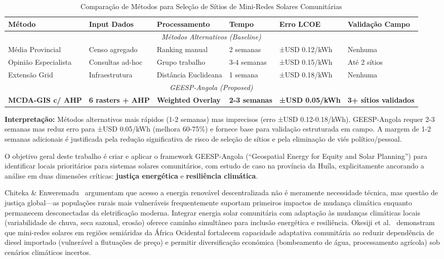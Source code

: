 \documentclass[12pt, a4paper]{article}
\begin{document}
{{{{{{{{{{{{\begin{table}[H]
\centering
\caption{Comparação de Métodos para Seleção de Sítios de Mini-Redes Solares Comunitárias}
\label{tab:metodo_comparacao}
\footnotesize
\begin{tabular}{|l|l|l|l|l|l|}
\hline
\textbf{Método} & \textbf{Input Dados} & \textbf{Processamento} & \textbf{Tempo} & \textbf{Erro LCOE} & \textbf{Validação Campo} \\
\hline
\multicolumn{6}{|c|}{\textit{Métodos Alternativos (Baseline)}} \\
\hline
Média Provincial & Censo agregado & Ranking manual & 2 semanas & ±USD 0.12/kWh & Nenhuma \\
\hline
Opinião Especialista & Consultas ad-hoc & Grupo trabalho & 3-4 semanas & ±USD 0.15/kWh & Até 2 sítios \\
\hline
Extensão Grid & Infraestrutura & Distância Euclideana & 1 semana & ±USD 0.18/kWh & Nenhuma \\
\hline
\multicolumn{6}{|c|}{\textit{GEESP-Angola (Proposed)}} \\
\hline
\textbf{MCDA-GIS c/ AHP} & \textbf{6 rasters + AHP} & \textbf{Weighted Overlay} & \textbf{2-3 semanas} & \textbf{±USD 0.05/kWh}\footnotemark[1] & \textbf{3+ sítios validados} \\
\hline
\end{tabular}
\end{table}

\noindent\textbf{Interpretação:} Métodos alternativos mais rápidos (1-2 semanas) mas imprecisos (erro ±USD 0.12-0.18/kWh). GEESP-Angola requer 2-3 semanas mas reduz erro para ±USD 0.05/kWh (melhora 60-75\%) e fornece base para validação estruturada em campo. A margem de 1-2 semanas adicionais é justificada pela redução significativa de risco de seleção de sítios e pela eliminação de viés político/pessoal.

O objetivo geral deste trabalho é criar e aplicar o framework GEESP-Angola (``Geospatial Energy for Equity and Solar Planning'') para identificar locais prioritários para sistemas solares comunitários, com estudo de caso na província da Huíla, explicitamente ancorando a análise em duas dimensões críticas: \textbf{justiça energética} e \textbf{resiliência climática}.

Chiteka \& Enweremadu~\citep{Chiteka2025} argumentam que acesso a energia renovável descentralizada não é meramente necessidade técnica, mas questão de justiça global—as populações rurais mais vulneráveis frequentemente suportam primeiros impactos de mudança climática enquanto permanecem desconectadas da eletrificação moderna. Integrar energia solar comunitária com adaptação às mudanças climáticas locais (variabilidade de chuva, seca sazonal, erosão) oferece caminho simultâneo para inclusão energética e resiliência. Okesiji et al.~\citep{Okesiji2025} demonstram que mini-redes solares em regiões semiáridas da África Ocidental fortalecem capacidade adaptativa comunitária ao reduzir dependência de diesel importado (vulnerável a flutuações de preço) e permitir diversificação económica (bombeamento de água, processamento agrícola) sob cenários climáticos incertos.

}}}}}}}}}}}}
\end{document}
